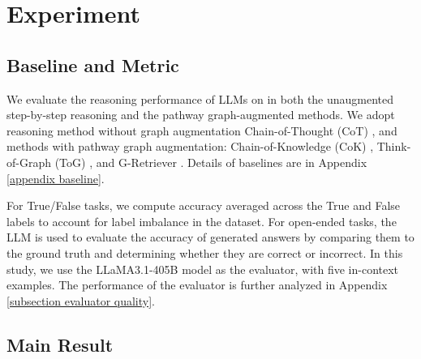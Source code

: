 \section{Experiment}

\subsection{Baseline and Metric}

We evaluate the reasoning performance of LLMs on \benchname in both the unaugmented step-by-step reasoning and the pathway graph-augmented methods. We adopt reasoning method without graph augmentation Chain-of-Thought (CoT) \citep{wei2022chain,kojima2022large}, and methods with pathway graph augmentation: {Chain-of-Knowledge (CoK)} \citep{li2023chain}, {Think-of-Graph (ToG)} \citep{sun2023think}, and {G-Retriever} \citep{he2024g}. Details of baselines are in Appendix \ref{appendix baseline}.

For True/False tasks, we compute accuracy averaged across the True and False labels to account for label imbalance in the dataset. For open-ended tasks, the LLM is used to evaluate the accuracy of generated answers by comparing them to the ground truth and determining whether they are correct or incorrect. In this study, we use the LLaMA3.1-405B model as the evaluator, with five in-context examples. The performance of the evaluator is further analyzed in Appendix \ref{subsection evaluator quality}.


\subsection{Main Result}





